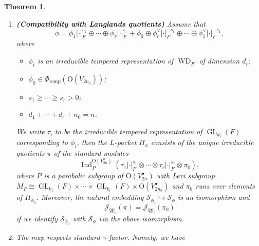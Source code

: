 \documentclass[article]{article}
\numberwithin{equation}{section}
\newtheorem{theorem}{Theorem}[section]
\theoremstyle{definition}
\DeclareMathOperator{\End}{End}
\DeclareMathOperator{\WD}{WD}
\DeclareMathOperator{\Ind}{Ind}
\DeclareMathOperator{\GL}{GL}
\begin{document}
\begin{theorem}
\begin{enumerate}[(1).]
		$$
		\Ind_{P}^{\mathrm O(V_{2n}^\bullet)}\left(\tau \otimes \pi_{0}\right)=\bigoplus_{\eta}\pi_{\mathfrak W_{c}}(\phi,\eta),
		$$
		where the sum runs over all $\widehat{\mathcal {S}_{\phi}}$ such that $\eta|_{\mathcal S_{\phi_0}}=\eta_0$. Moreover if $\phi_{\tau}$ is self-dual and of orthogonal type. Let 
		$$
		R_{\mathfrak W_c}(w, \tau \otimes \pi_0)
		\in \End_{\mathrm O(V_{2n}^\bullet)}
		\left(\Ind_{P}^{\mathrm O(V_{2n}^\bullet)}(\tau\otimes\pi_0)\right)$$ be the normalized intertwining operator associated to the Whittaker datum $\mathfrak W_{c}$ (see section \ref{normalizingintertwing}), where $w$ is the unique non-trivial element in the relative Wely group for $M_P$. Then
		$$R_{\mathfrak W_c}(w, \tau \otimes \pi_0) |_{\pi}=\mathcal J_{\mathfrak W_{c}}(\pi)(a),$$
		where $a \in \mathcal {S}_{\phi}$ corresponding $\phi_{\tau}$. 
	\item \textbf{(Compatibility with Langlands quotients)}
	Assume that
	$$\phi=\phi_1|\cdot|_{F}^{s_{1}}\oplus \cdots\oplus \phi_{r}|\cdot|_{F}^{s_{r}}+\phi_{0}\oplus \phi_{r}^\vee |\cdot|_{F}^{-s_{r}}\oplus \cdots\oplus \phi_1^\vee|\cdot|_{F}^{-s_{1}},$$ 
	where 
	\begin{itemize}
		\item $\phi_i$ is an irreducible tempered representation of $\WD_F$ of dimension $d_i$; 
		\item $\phi_0\in \Phi_{\mathrm{temp}}(\mathrm O(V_{2n_0}))$;
		\item $s_1\geq \cdots \geq s_r>0$;
		\item $d_1+\cdots +d_r+n_0=n$. 
	\end{itemize}
	We write $\tau_{i}$ to be the irreducible tempered representation of $\GL_{d_i}(F)$ corresponding to $\phi_i$, then the $L$-packet $\Pi_{\phi}$ consists of the unique irreducible quotients $\pi$ of the standard modules $$\Ind_{P}^{\mathrm O(V_{2n}^\bullet)}\left(\tau_{1}|\cdot|_{F}^{s_{1}} \otimes \cdots \otimes \tau_{r}|\cdot|_{F}^{s_{r}} \otimes \pi_{0}\right),$$
	where $P$ is a parabolic subgroup of $\mathrm O(V_{2n}^\bullet)$ with Levi subgroup $M_{P}\cong \GL_{k_{1}}(F) \times \cdots \times \GL_{k_{r}}(F) \times \mathrm O(V_{2n_0}^\bullet)$ and $\pi_{0}$ runs over elements of $\Pi_{\phi_{0}}$. Moreover, the natural embedding $\mathcal S_{\phi_0}\hookrightarrow  \mathcal {S}_{\phi}$ is an isomorphism and $$\mathcal J_{\mathfrak W_{c}}(\pi)=\mathcal J_{\mathfrak W_{c}}(\pi_0)$$ if we identify $\mathcal S_{\phi_0}$ with $\mathcal {S}_{\phi}$ via the above isomorphism. 
	\item
		The map respects standard $\gamma$-factor. Namely, we have 

\end{enumerate}
\end{theorem}
\end{document}
